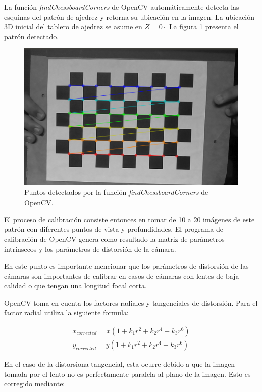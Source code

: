 La función \textit{findChessboardCorners} de OpenCV automáticamente detecta las esquinas del patrón de ajedrez y retorna su ubicación en la imagen. La ubicación 3D inicial del tablero de ajedrez se asume en $Z=0·$ La figura \ref{imagen:CalibracionAjedrez} presenta el patrón detectado.


\begin{figure}[H]
	\centering
	\includegraphics[width=0.7\linewidth]{imagenes/prototipo/Calibracion/cal1}
		
	\caption{Puntos detectados por la función \textit{findChessboardCorners} de OpenCV.}
	\label{imagen:CalibracionAjedrez}
\end{figure}


El proceso de calibración consiste entonces en tomar de 10 a 20 imágenes de este patrón con diferentes puntos de vista y profundidades. El programa de calibración de OpenCV genera como resultado la matriz de parámetros intrínsecos y los parámetros de distorsión de la cámara.

En este punto es importante mencionar que los parámetros de distorsión de las cámaras son importantes de calibrar en casos de cámaras con lentes de baja calidad o que tengan una longitud focal corta. 

OpenCV toma en cuenta los factores radiales y tangenciales de distorsión. Para el factor radial utiliza la siguiente formula:

\begin{align}
{ x }_{ corrected }=x(1+k_{ 1 }{ r }^{ 2 }+k_{ 2 }{ r }^{ 4 }+k_{ 3 }{ r }^{ 6 })\\ { y }_{ corrected }=y(1+k_{ 1 }{ r }^{ 2 }+k_{ 2 }{ r }^{ 4 }+k_{ 3 }{ r }^{ 6 })
\end{align}

En el caso de la distorsiona tangencial, esta ocurre debido a que la imagen tomada por el lento no es perfectamente paralela al plano de la imagen. Esto es corregido mediante:


